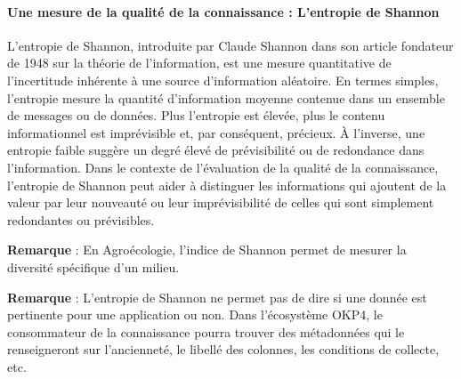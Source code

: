 \paragraph{Une mesure de la qualité de la connaissance : L'entropie de Shannon\\}\label{par:entropie_shannon}

L'entropie de Shannon, introduite par Claude Shannon dans son article fondateur de 1948 sur la théorie de l'information, est une mesure quantitative de l'incertitude inhérente à une source d'information aléatoire. En termes simples, l'entropie mesure la quantité d'information moyenne contenue dans un ensemble de messages ou de données. Plus l'entropie est élevée, plus le contenu informationnel est imprévisible et, par conséquent, précieux. À l'inverse, une entropie faible suggère un degré élevé de prévisibilité ou de redondance dans l'information. Dans le contexte de l'évaluation de la qualité de la connaissance, l'entropie de Shannon peut aider à distinguer les informations qui ajoutent de la valeur par leur nouveauté ou leur imprévisibilité de celles qui sont simplement redondantes ou prévisibles. 

\textbf{Remarque} : En Agroécologie, l'indice de Shannon permet de mesurer la diversité spécifique d'un milieu.

\textbf{Remarque} : L'entropie de Shannon ne permet pas de dire si une donnée est pertinente pour une application ou non. Dans l'écosystème OKP4, le consommateur de la connaissance pourra trouver des métadonnées qui le renseigneront sur l'ancienneté, le libellé des colonnes, les conditions de collecte, etc.

